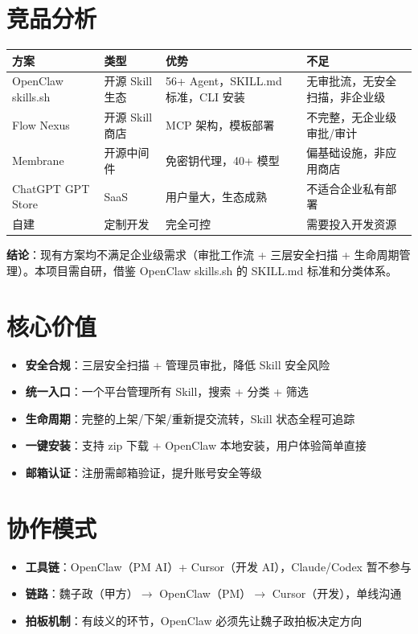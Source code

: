 \documentclass[11pt,a4paper]{article}
\begin{document}
\section{竞品分析}

\begin{table}[h]
\centering
\begin{tabularx}{\linewidth}{lXXX}
\toprule
\textbf{方案} & \textbf{类型} & \textbf{优势} & \textbf{不足} \\
\midrule
OpenClaw skills.sh & 开源 Skill 生态 & 56+ Agent，SKILL.md 标准，CLI 安装 & 无审批流，无安全扫描，非企业级 \\
Flow Nexus & 开源 Skill 商店 & MCP 架构，模板部署 & 不完整，无企业级审批/审计 \\
Membrane & 开源中间件 & 免密钥代理，40+ 模型 & 偏基础设施，非应用商店 \\
ChatGPT GPT Store & SaaS & 用户量大，生态成熟 & 不适合企业私有部署 \\
自建 & 定制开发 & 完全可控 & 需要投入开发资源 \\
\bottomrule
\end{tabularx}
\end{table}

\textbf{结论}：现有方案均不满足企业级需求（审批工作流 + 三层安全扫描 + 生命周期管理）。本项目需自研，借鉴 OpenClaw skills.sh 的 SKILL.md 标准和分类体系。

\section{核心价值}

\begin{itemize}[nosep]
  \item \textbf{安全合规}：三层安全扫描 + 管理员审批，降低 Skill 安全风险
  \item \textbf{统一入口}：一个平台管理所有 Skill，搜索 + 分类 + 筛选
  \item \textbf{生命周期}：完整的上架/下架/重新提交流转，Skill 状态全程可追踪
  \item \textbf{一键安装}：支持 zip 下载 + OpenClaw 本地安装，用户体验简单直接
  \item \textbf{邮箱认证}：注册需邮箱验证，提升账号安全等级
\end{itemize}

\section{协作模式}

\begin{itemize}[nosep]
  \item \textbf{工具链}：OpenClaw（PM AI）+ Cursor（开发 AI），Claude/Codex 暂不参与
  \item \textbf{链路}：魏子政（甲方）$\to$ OpenClaw（PM）$\to$ Cursor（开发），单线沟通
  \item \textbf{拍板机制}：有歧义的环节，OpenClaw 必须先让魏子政拍板决定方向
\end{itemize}
\end{document}
